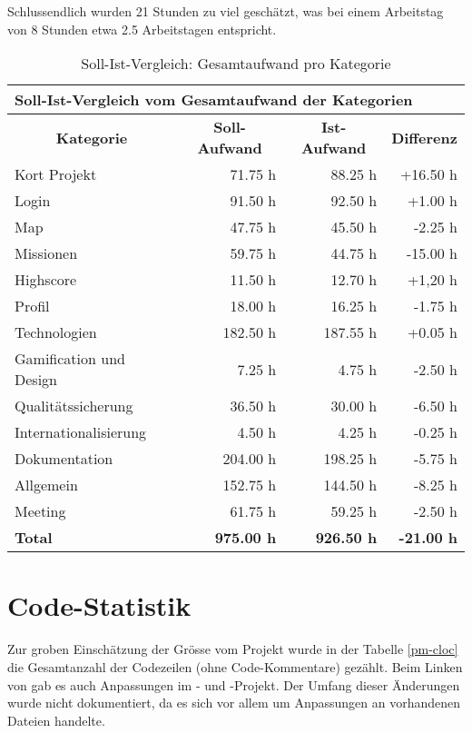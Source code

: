 Schlussendlich wurden 21 Stunden zu viel geschätzt, was bei einem Arbeitstag von 8 Stunden etwa 2.5 Arbeitstagen entspricht. 


\begin{table}[H]
\centering
\label{pm-arbeitsaufwand-kategorie-ges}
\begin{tabular}{|l|r|r|r|}
\hline
\multicolumn{4}{|l|}{\textbf{Soll-Ist-Vergleich vom Gesamtaufwand der Kategorien}} \\
\hline
\multicolumn{1}{|c|}{\textbf{Kategorie}} & \multicolumn{1}{|c|}{\textbf{Soll-Aufwand}} & \multicolumn{1}{|c|}{\textbf{Ist-Aufwand}} & \multicolumn{1}{|c|}{\textbf{Differenz}}\\
\hline
Kort Projekt & 71.75 h & 88.25 h & +16.50 h \\
\hline
Login & 91.50 h & 92.50 h & +1.00 h \\
\hline
Map & 47.75	h & 45.50 h & -2.25 h \\
\hline
Missionen & 59.75 h & 44.75 h & -15.00 h \\
\hline
Highscore & 11.50 h & 12.70 h & +1,20 h \\
\hline
Profil & 18.00 h & 16.25 h & -1.75 h \\
\hline
Technologien & 182.50 h & 187.55 h & +0.05 h \\
\hline
Gamification und Design & 7.25 h & 4.75 h & -2.50 h \\
\hline
Qualitätssicherung & 36.50 h & 30.00 h & -6.50 h \\
\hline
Internationalisierung & 4.50 h & 4.25 h & -0.25 h \\
\hline
Dokumentation & 204.00 h & 198.25 h & -5.75 h \\
\hline
Allgemein & 152.75 h & 144.50 h & -8.25 h \\
\hline
Meeting & 61.75 h & 59.25 h & -2.50 h \\
\hline
\textbf{Total} & \textbf{975.00 h} & \textbf{926.50 h} & \textbf{-21.00 h} \\
\hline
\end{tabular}
\caption{Soll-Ist-Vergleich: Gesamtaufwand pro Kategorie}
\end{table}

\section{Code-Statistik}
Zur groben Einschätzung der Grösse vom Projekt wurde in der Tabelle \ref{pm-cloc} die Gesamtanzahl der  Codezeilen (ohne Code-Kommentare) gezählt. 
Beim Linken von  gab es auch Anpassungen im - und -Projekt. 
Der Umfang dieser Änderungen wurde nicht dokumentiert, da es sich vor allem um Anpassungen an vorhandenen Dateien handelte. 

